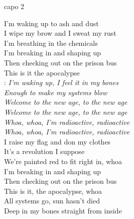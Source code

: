 
\hfill capo 2

I’m waking up to ash and dust\\
I wipe my brow and I sweat my rust\\
I’m breathing in the chemicals\\

I’m breaking in and shaping up\\
Then checking out on the prison bus\\
This is it the apocalypse\\

\textregistered:
\emph{I’m waking up, I feel it in my bones\\
Enough to make my systems blow\\
Welcome to the new age, to the new age\\
Welcome to the new age, to the new age\\
Whoa, whoa, I’m radioactive, radioactive\\
Whoa, whoa, I’m radioactive, radioactive}\\

I raise my flag and don my clothes\\
It’s a revolution I suppose\\
We’re painted red to fit right in, whoa\\

I’m breaking in and shaping up\\
Then checking out on the prison bus\\
This is it, the apocalypse, whoa \hspace{1cm}\textregistered\\

All systems go, sun hasn’t died\\
Deep in my bones straight from inside \hspace{1cm}\textregistered

\newpage
